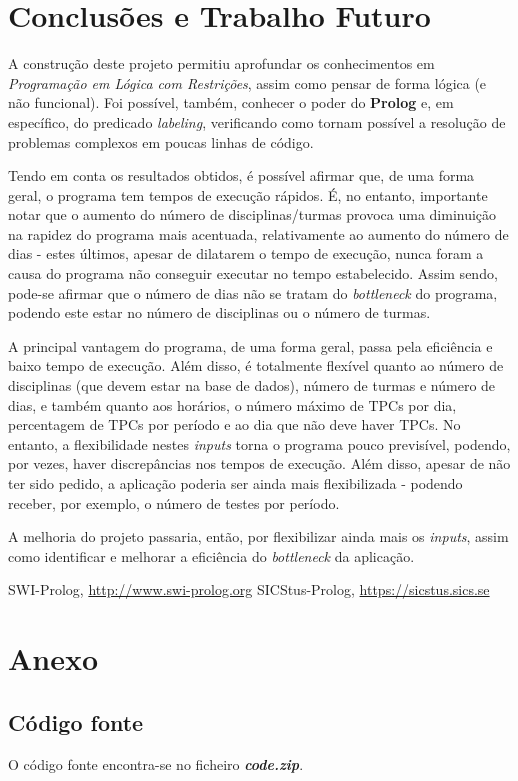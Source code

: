 \documentclass{llncs}
\begin{document}
\section{Conclusões e Trabalho Futuro}
A construção deste projeto permitiu aprofundar os conhecimentos em \textit{Programação em Lógica com Restrições}, assim como pensar de forma lógica (e não funcional). Foi possível, também, conhecer o poder do \textbf{Prolog} e, em específico, do predicado \textit{labeling}, verificando como tornam possível a resolução de problemas complexos em poucas linhas de código.\par
Tendo em conta os resultados obtidos, é possível afirmar que, de uma forma geral, o programa tem tempos de execução rápidos. É, no entanto, importante notar que o aumento do número de disciplinas/turmas provoca uma diminuição na rapidez do programa mais acentuada, relativamente ao aumento do número de dias - estes últimos, apesar de dilatarem o tempo de execução, nunca foram a causa do programa não conseguir executar no tempo estabelecido.\newline
Assim sendo, pode-se afirmar que o número de dias não se tratam do \textit{bottleneck} do programa, podendo este estar no número de disciplinas ou o número de turmas.\par
A principal vantagem do programa, de uma forma geral, passa pela eficiência e baixo tempo de execução. Além disso, é totalmente flexível quanto ao número de disciplinas (que devem estar na base de dados), número de turmas e número de dias, e também quanto aos horários, o número máximo de TPCs por dia, percentagem de TPCs por período e ao dia que não deve haver TPCs.\newline
No entanto, a flexibilidade nestes \textit{inputs} torna o programa pouco previsível, podendo, por vezes, haver discrepâncias nos tempos de execução. Além disso, apesar de não ter sido pedido, a aplicação poderia ser ainda mais flexibilizada - podendo receber, por exemplo, o número de testes por período.\par
A melhoria do projeto passaria, então, por flexibilizar ainda mais os \textit{inputs}, assim como identificar e melhorar a eficiência do \textit{bottleneck} da aplicação.



%
%
\begin{thebibliography}{5}
%
SWI-Prolog,
\url{http://www.swi-prolog.org}
SICStus-Prolog,
\url{https://sicstus.sics.se}


\end{thebibliography}
\clearpage

\section*{Anexo}
\subsection*{Código fonte}
O código fonte encontra-se no ficheiro \textit{\textbf{code.zip}}.
\end{document}
